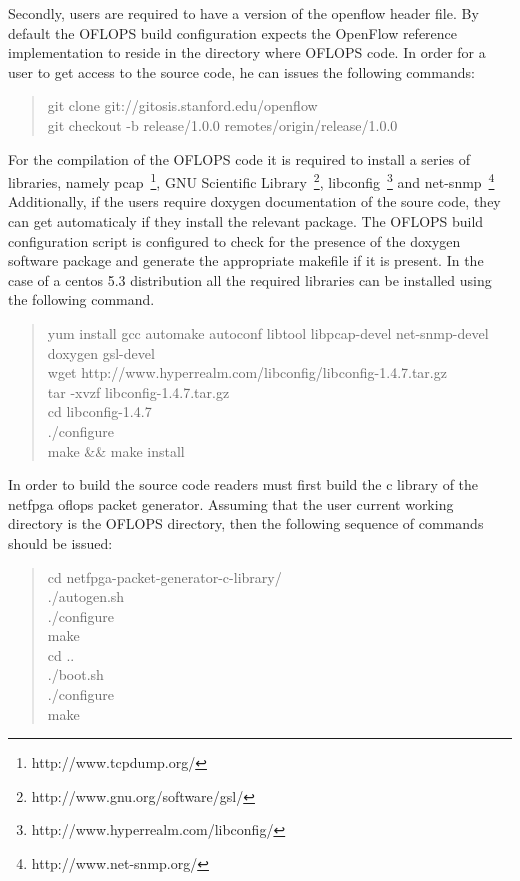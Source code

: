 \documentclass{book}
\begin{document}
Secondly, users are required to have a version of the openflow header file.
By default the OFLOPS build configuration expects the OpenFlow reference
implementation to reside in the directory where OFLOPS code. In order
for a user to get access to the source code, he can issues the following
commands:

\begin{quote}
git clone git://gitosis.stanford.edu/openflow \\
git checkout -b release/1.0.0 remotes/origin/release/1.0.0
\end{quote}

For the compilation of the OFLOPS code it is required to install a
series of libraries, namely pcap~\footnote{http://www.tcpdump.org/}, 
GNU Scientific Library~\footnote{http://www.gnu.org/software/gsl/}, 
libconfig~\footnote{http://www.hyperrealm.com/libconfig/} 
and net-snmp~\footnote{http://www.net-snmp.org/} Additionally, if the users 
require doxygen documentation of the soure code, they can get automaticaly 
if they install the relevant package. The OFLOPS build configuration script 
is configured to check for the presence of the 
doxygen software package and generate the appropriate makefile if it is 
present. In the case of a centos 5.3 distribution all the required libraries 
can be installed using the following command.

\begin{quote}
yum install gcc automake autoconf libtool libpcap-devel net-snmp-devel
doxygen gsl-devel\\
wget http://www.hyperrealm.com/libconfig/libconfig-1.4.7.tar.gz\\
tar -xvzf libconfig-1.4.7.tar.gz \\
cd libconfig-1.4.7 \\
./configure \\
make \&\& make install 
\end{quote}

In order to build the source code readers must first build the c library of the
netfpga oflops packet generator. Assuming that the user current working 
directory is the OFLOPS directory, then the following sequence of commands 
should be issued:

\begin{quote}
cd netfpga-packet-generator-c-library/ \\
./autogen.sh \\
./configure \\
make \\
cd .. \\
./boot.sh \\
./configure \\
make \\
\end{quote}
\end{document}
